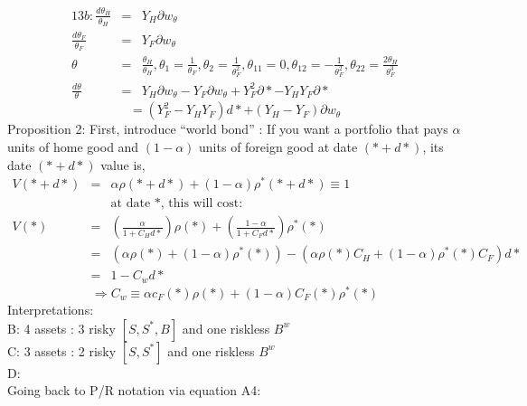 \documentclass[]{article}
\begin{document}
\begin{eqnarray*}
13b: \frac{d\theta_H}{\theta_H} &=& Y_H \partial w_\theta\\
\frac{d\theta_F}{\theta_F} &=& Y_F \partial w_\theta\\
\theta &=& \frac{\theta_H}{\theta_H}, \theta_1 = \frac{1}{\theta_F}, \theta_2 = \frac{1}{\theta_F^2},\theta_{11} = 0, \theta_{12} = -\frac{1}{\theta_F^2}, \theta_{22} = \frac{2\theta_H}{\theta_F^3}\\
\frac{d\theta}{\theta} &=& Y_H \partial w_\theta - Y_F \partial w_\theta + Y_F^2 \partial * - Y_H Y_F \partial *
\end{eqnarray*}
\begin{equation}
= (Y_F^2 - Y_H Y_F)d* + (Y_H-Y_F) \partial w_\theta
\end{equation}
Proposition 2:
First, introduce ``world bond'' : If you want a portfolio that pays $\alpha $ units of home good and $(1-\alpha )$ units of foreign good at date $(*+d*)$, its date $(*+d*)$ value is,
\begin{eqnarray*}
V(*+d*) &=& \alpha \rho(*+d*) +(1-\alpha) \rho ^* (*+d*) \equiv 1\\
&&\mbox{at date *, this will cost:}\\
V(*) &=& \left(\frac{\alpha}{1+C_Hd*}\right) \rho(*) + \left(\frac{1-\alpha}{1+C_Fd*}\right)\rho^*(*)\\
&=& (\alpha \rho(*) + (1-\alpha) \rho^* (*) ) - (\alpha \rho(*) C_H +(1-\alpha)\rho^*(*)C_F)d*\\
&=& 1- C_w d*
\end{eqnarray*}
\begin{equation}
\Rightarrow C_w \equiv \alpha c_F(*) \rho(*) + (1-\alpha) C_F(*) \rho^*(*)
\end{equation}
Interpretations:\\
B: 4 assets : 3 risky $[S,S^*, B]$ and one riskless $B^w$\\
C: 3 assets : 2 risky $[S,S^*]$ and one riskless $B^w$\\
D:\\
Going back to P/R notation via equation A4:\\
\end{document}

